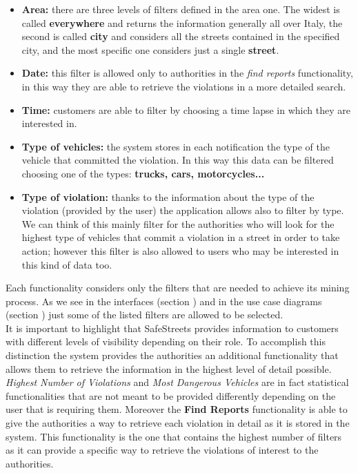 		\begin{itemize}
			\item \textbf{Area:} there are three levels of filters defined in the area one. The widest is called \textbf{everywhere} and returns the information generally all over Italy, the second is called \textbf{city} and considers all the streets contained in the specified city, and the most specific one considers just a single \textbf{street}.
			
			\item \textbf{Date:} this filter is allowed only to authorities in the \emph{find reports} functionality, in this way they are able to retrieve the violations in a more detailed search.
			
			\item \textbf{Time:} customers are able to filter by choosing a time lapse in which they are interested in. 
			
			\item \textbf{Type of vehicles:} the system stores in each notification the type of the vehicle that committed the violation. In this way this data can be filtered choosing one of the types: \textbf{trucks, cars, motorcycles...}
			
			\item \textbf{Type of violation:} thanks to the information about the type of the violation (provided by the user) the application allows also to filter by type. We can think of this  mainly filter for the authorities who will look for the highest type of vehicles that commit a violation in a street in order to take action; however this filter is also allowed to users who may be interested in this kind of data too.
		\end{itemize}
	
		Each functionality considers only the filters that are needed to achieve its mining process. As we see in the interfaces (section ) and in the use case diagrams (section ) just some of the listed filters are allowed to be selected. \\
		
		It is important to highlight that SafeStreets provides information to customers with different levels of visibility depending on their role. To accomplish this distinction the system provides the authorities an additional functionality that allows them to retrieve the information in the highest level of detail possible. \emph{Highest Number of Violations} and \emph{Most Dangerous Vehicles} are in fact statistical functionalities that are not meant to be provided differently depending on the user that is requiring them. Moreover the \textbf{Find Reports} functionality is able to give the authorities a way to retrieve each violation in detail as it is stored in the system. This functionality is the one that contains the highest number of filters as it can provide a specific way to retrieve the violations of interest to the authorities. 

